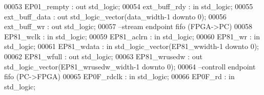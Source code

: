 \begin{DoxyCode}
00053                 \textcolor{vhdlchar}{EP01_rempty}     \textcolor{vhdlchar}{:} \textcolor{keywordflow}{out} \textcolor{comment}{std\_logic};
00054                 \textcolor{vhdlchar}{ext_buff_rdy}    \textcolor{vhdlchar}{:} \textcolor{keywordflow}{in} \textcolor{comment}{std\_logic};
00055                 \textcolor{vhdlchar}{ext_buff_data}   \textcolor{vhdlchar}{:} \textcolor{keywordflow}{out} \textcolor{comment}{std\_logic\_vector}\textcolor{vhdlchar}{(}\textcolor{vhdlchar}{data_width}\textcolor{vhdlchar}{-}\textcolor{vhdllogic}{}\textcolor{vhdllogic}{1} \textcolor{keywordflow}{downto} \textcolor{vhdllogic}{}\textcolor{vhdllogic}{0}\textcolor{vhdlchar}{)};
00056                 \textcolor{vhdlchar}{ext_buff_wr}     \textcolor{vhdlchar}{:} \textcolor{keywordflow}{out} \textcolor{comment}{std\_logic};
00057 \textcolor{keyword}{                --stream endpoint fifo (FPGA->PC)}
00058                 \textcolor{vhdlchar}{EP81_wclk}       \textcolor{vhdlchar}{:} \textcolor{keywordflow}{in} \textcolor{comment}{std\_logic};
00059                 \textcolor{vhdlchar}{EP81_aclrn}      \textcolor{vhdlchar}{:} \textcolor{keywordflow}{in} \textcolor{comment}{std\_logic};
00060                 \textcolor{vhdlchar}{EP81_wr}         \textcolor{vhdlchar}{:} \textcolor{keywordflow}{in} \textcolor{comment}{std\_logic};
00061                 \textcolor{vhdlchar}{EP81_wdata}      \textcolor{vhdlchar}{:} \textcolor{keywordflow}{in} \textcolor{comment}{std\_logic\_vector}\textcolor{vhdlchar}{(}\textcolor{vhdlchar}{EP81_wwidth}\textcolor{vhdlchar}{-}\textcolor{vhdllogic}{}\textcolor{vhdllogic}{1} \textcolor{keywordflow}{downto} \textcolor{vhdllogic}{}\textcolor{vhdllogic}{0}\textcolor{vhdlchar}{)};
00062                 \textcolor{vhdlchar}{EP81_wfull}      \textcolor{vhdlchar}{:} \textcolor{keywordflow}{out} \textcolor{comment}{std\_logic};
00063                 \textcolor{vhdlchar}{EP81_wrusedw}    \textcolor{vhdlchar}{:} \textcolor{keywordflow}{out} \textcolor{comment}{std\_logic\_vector}\textcolor{vhdlchar}{(}\textcolor{vhdlchar}{EP81_wrusedw_width}\textcolor{vhdlchar}{-}\textcolor{vhdllogic}{}\textcolor{vhdllogic}{1} \textcolor{keywordflow}{downto} \textcolor{vhdllogic}{}\textcolor{vhdllogic}{0}\textcolor{vhdlchar}{)};
00064 \textcolor{keyword}{                --controll endpoint fifo (PC->FPGA)}
00065                 \textcolor{vhdlchar}{EP0F_rdclk}      \textcolor{vhdlchar}{:} \textcolor{keywordflow}{in} \textcolor{comment}{std\_logic};
00066                 \textcolor{vhdlchar}{EP0F_rd}         \textcolor{vhdlchar}{:} \textcolor{keywordflow}{in} \textcolor{comment}{std\_logic};

\end{DoxyCode}
